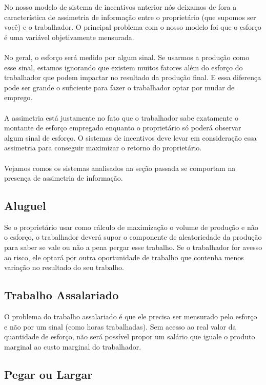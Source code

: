 \documentclass[a4paper,11pt,oneside]{book}
\theoremstyle{definition}
\theoremstyle{break}
\begin{document}
No nosso modelo de sistema de incentivos anterior nós deixamos de fora a característica de assimetria de informação entre o proprietário (que supomos ser você) e o trabalhador. O principal problema com o nosso modelo foi que o esforço é uma variável objetivamente mensurada.
\\~\\
No geral, o esforço será medido por algum sinal. Se usarmos a produção como esse sinal, estamos ignorando que existem muitos fatores além do esforço do trabalhador que podem impactar no resultado da produção final. E essa diferença pode ser grande o suficiente para fazer o trabalhador optar por mudar de emprego.
\\~\\
A assimetria está justamente no fato que o trabalhador sabe exatamente o montante de esforço empregado enquanto o proprietário só poderá observar algum sinal de esforço. O sistemas de incentivos deve levar em consideração essa assimetria para conseguir maximizar o retorno do proprietário.
\\~\\
Vejamos comos os sistemas analisados na seção passada se comportam na presença de assimetria de informação.

\subsection*{Aluguel}

Se o proprietário usar como cálculo de maximização o volume de produção e não o esforço, o trabalhador deverá supor o componente de aleatoriedade da produção para saber se vale ou não a pena pergar esse trabalho. Se o trabalhador for avesso ao risco, ele optará por outra oportunidade de trabalho que contenha menos variação no resultado do seu trabalho.

\subsection*{Trabalho Assalariado}

O problema do trabalho assalariado é que ele precisa ser mensurado pelo esforço e não por um sinal (como horas trabalhadas). Sem acesso ao real valor da quantidade de esforço, não será possível propor um salário que iguale o produto marginal ao custo marginal do trabalhador.

\subsection*{Pegar ou Largar}
\end{document}
